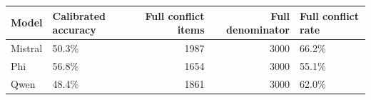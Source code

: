 \begin{tabular}{llrrl}
\toprule
Model & Calibrated accuracy & Full conflict items & Full denominator & Full conflict rate \\
\midrule
Mistral & 50.3\% & 1987 & 3000 & 66.2\% \\
Phi & 56.8\% & 1654 & 3000 & 55.1\% \\
Qwen & 48.4\% & 1861 & 3000 & 62.0\% \\
\bottomrule
\end{tabular}
